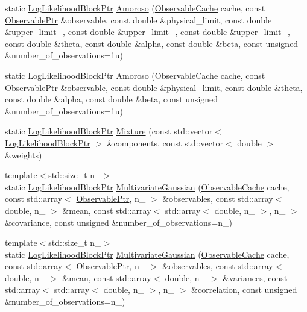 \begin{DoxyCompactItemize}
\item 
static \hyperlink{namespaceeos_ab823a6782e060c440e05a614158ad1bf}{LogLikelihoodBlockPtr} \hyperlink{classeos_1_1LogLikelihoodBlock_acdc69e205b9a51fb238833bda103c2f7}{Amoroso} (\hyperlink{classeos_1_1ObservableCache}{ObservableCache} cache, const \hyperlink{namespaceeos_a470e5dd806bd129080f1aa0c2954646f}{ObservablePtr} \&observable, const double \&physical\_\-limit, const double \&upper\_\-limit\_, const double \&upper\_\-limit\_, const double \&upper\_\-limit\_, const double \&theta, const double \&alpha, const double \&beta, const unsigned \&number\_\-of\_\-observations=1u)
\item 
static \hyperlink{namespaceeos_ab823a6782e060c440e05a614158ad1bf}{LogLikelihoodBlockPtr} \hyperlink{classeos_1_1LogLikelihoodBlock_ae35b8b72185c9ca409a6dfde49de07a1}{Amoroso} (\hyperlink{classeos_1_1ObservableCache}{ObservableCache} cache, const \hyperlink{namespaceeos_a470e5dd806bd129080f1aa0c2954646f}{ObservablePtr} \&observable, const double \&physical\_\-limit, const double \&theta, const double \&alpha, const double \&beta, const unsigned \&number\_\-of\_\-observations=1u)
\item 
static \hyperlink{namespaceeos_ab823a6782e060c440e05a614158ad1bf}{LogLikelihoodBlockPtr} \hyperlink{classeos_1_1LogLikelihoodBlock_a7a47859d5eff2ef0a6b38ef3e70ee1d0}{Mixture} (const std::vector$<$ \hyperlink{namespaceeos_ab823a6782e060c440e05a614158ad1bf}{LogLikelihoodBlockPtr} $>$ \&components, const std::vector$<$ double $>$ \&weights)
\item 
{\footnotesize template$<$std::size\_\-t n\_\-$>$ }\\static \hyperlink{namespaceeos_ab823a6782e060c440e05a614158ad1bf}{LogLikelihoodBlockPtr} \hyperlink{classeos_1_1LogLikelihoodBlock_a1532bcb8dc34234cb7c4f39a3e82031e}{MultivariateGaussian} (\hyperlink{classeos_1_1ObservableCache}{ObservableCache} cache, const std::array$<$ \hyperlink{namespaceeos_a470e5dd806bd129080f1aa0c2954646f}{ObservablePtr}, n\_\- $>$ \&observables, const std::array$<$ double, n\_\- $>$ \&mean, const std::array$<$ std::array$<$ double, n\_\- $>$, n\_\- $>$ \&covariance, const unsigned \&number\_\-of\_\-observations=n\_\-)
\item 
{\footnotesize template$<$std::size\_\-t n\_\-$>$ }\\static \hyperlink{namespaceeos_ab823a6782e060c440e05a614158ad1bf}{LogLikelihoodBlockPtr} \hyperlink{classeos_1_1LogLikelihoodBlock_a6b124551639991dd21a9e11e9a2d54c6}{MultivariateGaussian} (\hyperlink{classeos_1_1ObservableCache}{ObservableCache} cache, const std::array$<$ \hyperlink{namespaceeos_a470e5dd806bd129080f1aa0c2954646f}{ObservablePtr}, n\_\- $>$ \&observables, const std::array$<$ double, n\_\- $>$ \&mean, const std::array$<$ double, n\_\- $>$ \&variances, const std::array$<$ std::array$<$ double, n\_\- $>$, n\_\- $>$ \&correlation, const unsigned \&number\_\-of\_\-observations=n\_\-)
\end{DoxyCompactItemize}


